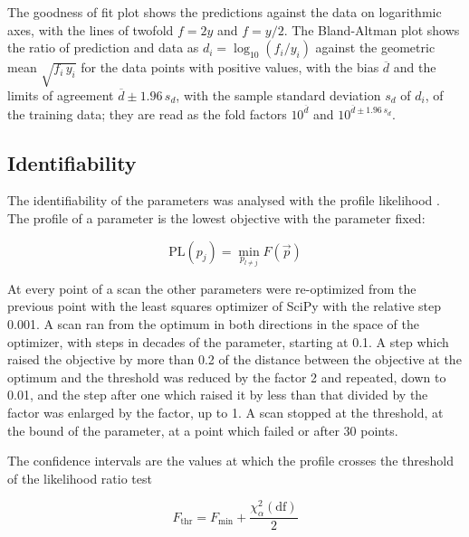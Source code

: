 \documentclass{article}
\begin{document}
The goodness of fit plot shows the predictions against the data on logarithmic axes, with the lines of twofold $f = 2y$ and $f = y/2$. The Bland-Altman plot \cite{Bland1986} shows the ratio of prediction and data as $d_i = \log_{10}(f_i / y_i)$ against the geometric mean $\sqrt{f_i\, y_i}$ for the data points with positive values, with the bias $\overline{d}$ and the limits of agreement $\overline{d} \pm 1.96\, s_d$, with the sample standard deviation $s_d$ of $d_i$, of the training data; they are read as the fold factors $10^{\overline{d}}$ and $10^{\overline{d} \pm 1.96\, s_d}$.

\subsection{Identifiability}

The identifiability of the parameters was analysed with the profile likelihood \cite{Raue2009,Kreutz2013}. The profile of a parameter is the lowest objective with the parameter fixed:

\begin{equation}
\mathrm{PL}(p_j) = \min_{p_{l \neq j}} F(\vec{p})
\end{equation}

At every point of a scan the other parameters were re-optimized from the previous point with the least squares optimizer of SciPy with the relative step 0.001. A scan ran from the optimum in both directions in the space of the optimizer, with steps in decades of the parameter, starting at 0.1. A step which raised the objective by more than 0.2 of the distance between the objective at the optimum and the threshold was reduced by the factor 2 and repeated, down to 0.01, and the step after one which raised it by less than that divided by the factor was enlarged by the factor, up to 1. A scan stopped at the threshold, at the bound of the parameter, at a point which failed or after 30 points.

The confidence intervals are the values at which the profile crosses the threshold of the likelihood ratio test

\begin{equation}
F_{\mathrm{thr}} = F_{\min} + \frac{\chi^2_{\alpha}(\mathrm{df})}{2}
\end{equation}
\end{document}
